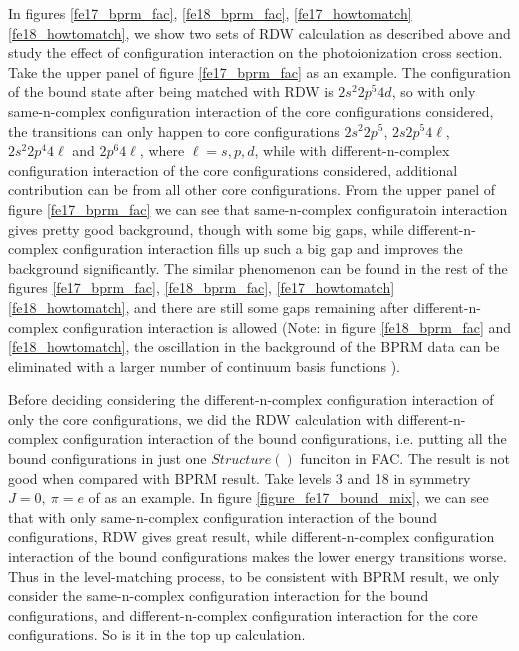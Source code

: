 In figures \ref{fe17_bprm_fac}, \ref{fe18_bprm_fac}, \ref{fe17_howtomatch} \ref{fe18_howtomatch}, we show two sets of RDW calculation as described above and study the effect of configuration interaction on the photoionization cross section. Take the upper panel of figure \ref{fe17_bprm_fac} as an example. The configuration of the bound state after being matched with RDW is $2s^2 2p^5 4d$, so with only same-n-complex configuration interaction of the core configurations considered, the transitions can only happen to core configurations $2s^2 2p^5$, $2s 2p^5 4\ell$, $2s^2 2p^4 4\ell$ and $2p^6 4\ell$, where $\ell=s, p, d$, while with different-n-complex configuration interaction of the core configurations considered, additional contribution can be from all other core configurations. From  the upper panel of figure \ref{fe17_bprm_fac} we can see that same-n-complex configuratoin interaction gives pretty good background, though with some big gaps, while different-n-complex configuration interaction fills up such a big gap and improves the background significantly. The similar phenomenon can be found in the rest of the figures  \ref{fe17_bprm_fac}, \ref{fe18_bprm_fac}, \ref{fe17_howtomatch} \ref{fe18_howtomatch}, and there are still some gaps remaining after different-n-complex configuration interaction is allowed (Note: in figure \ref{fe18_bprm_fac} and \ref{fe18_howtomatch}, the oscillation in the background of the BPRM data can be eliminated with a larger number of continuum basis functions \citep{zhang_1998}).

Before deciding considering the different-n-complex configuration interaction of only the core configurations, we did the RDW calculation with different-n-complex configuration interaction of the bound configurations, i.e. putting all the bound configurations in just one $Structure()$ funciton in FAC. The result is not good when compared with BPRM result. Take levels 3 and 18 in symmetry $J=0,~\pi=e$ of  as an example. In figure \ref{figure_fe17_bound_mix}, we can see that with only same-n-complex configuration interaction of the bound configurations, RDW gives great result, while different-n-complex configuration interaction of the bound configurations makes the lower energy transitions worse. Thus in the level-matching process, to be consistent with BPRM result, we only consider the same-n-complex configuration interaction for the bound configurations, and different-n-complex configuration interaction for the core configurations. So is it in the top up calculation. 


